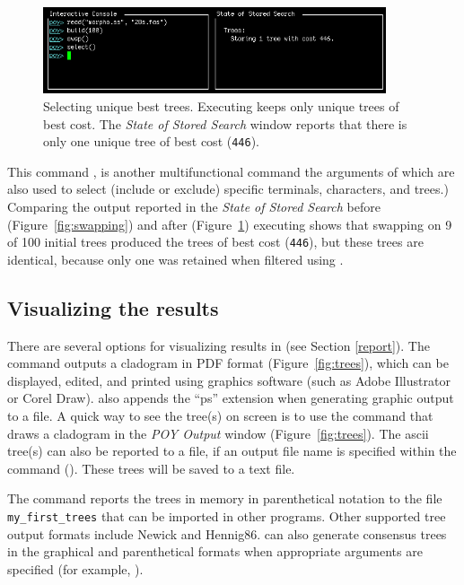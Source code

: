 {\begin{figure}[]
    \begin{center}
        \includegraphics[width=0.9\textwidth]{doc/figures/select.jpg}
    \end{center}
    \caption{Selecting unique best trees. Executing  keeps only unique trees of best cost. The \emph{State of Stored Search} window reports that there is only one unique tree of best cost (\texttt{446}).}
    \label{fig:select}
\end{figure}

This command , is another multifunctional command the arguments of which are also used to select (include or exclude) specific terminals, characters, and trees.) Comparing the output reported in the \emph{State of Stored Search} before (Figure~\ref{fig:swapping}) and after (Figure~\ref{fig:select}) executing  shows that swapping on 9 of 100 initial trees produced the trees of best cost (\texttt{446}), but these trees are identical, because only one was retained when filtered using .

\subsection{Visualizing the results}

There are several options for visualizing results in \poy (see Section \ref{report}). The command
 outputs a cladogram in PDF format (Figure~\ref{fig:trees}), which can be displayed, edited, and printed using graphics software (such as Adobe Illustrator or Corel Draw). \poy also appends the ``ps'' extension when generating graphic output to a file. A quick way to see the tree(s) on screen is to use the command  that draws a cladogram in the \emph{POY Output} window (Figure~\ref{fig:trees}). The ascii tree(s) can also be reported to a file, if an output file name is specified within the command ().  These trees will be saved to a text file.

The command  reports the trees in memory in parenthetical notation to the file \texttt{my\_first\_trees} that can be imported in other programs. Other supported tree output formats include Newick and Hennig86.  can also generate consensus trees in the graphical and parenthetical formats when appropriate arguments are specified (for example, ).

}
